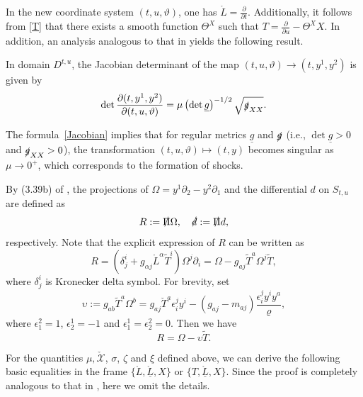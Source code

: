\documentclass[11pt,twoside]{article}
\def\al{\alpha}
\def\f{\frac}
\def\p{\partial}
\begin{document}
In the new coordinate system $(t, u, \vartheta)$, one has $\mathring{L} = \frac{\partial}{\partial t}$. Additionally, it
follows from \eqref{T} that
there exists a smooth function $\Theta^X$ such that $T=\frac{\partial}{\partial u} - \Theta^X X$.
In addition, an analysis analogous to that in \cite[Lemma 3.66]{Sp} yields the following result.


\begin{lemma}
In domain $D^{t,u}$, the Jacobian determinant of the map $(t, u, \vartheta) \rightarrow (t, y^1, y^2)$ is given by
\begin{equation}\label{Jacobian}
\det\frac{\partial(t, y^1, y^2)}{\partial(t, u, \vartheta)} = \mu \left(\det\underline{g}\right)^{-1/2} \sqrt{\slashed{g}_{XX}}.
\end{equation}
\end{lemma}

\begin{remark}
The formula~\eqref{Jacobian} implies that for regular  metrics $\underline g$ and $\slashed g$  (i.e., $\det\underline{g} > 0$ and
$\slashed{g}_{XX} > 0$), the transformation $(t,u,\vartheta)\mapsto (t,y)$
becomes singular as $\mu\to 0^+$, which corresponds to the  formation of shocks.
\end{remark}

By (3.39b) of \cite{Sp},
the projections of $\Omega=y^1\p_2-y^2\p_1$ and  the differential $d$ on $S_{t, u}$ are defined
as
\begin{equation*}
R:=\slashed\Pi\Omega,\quad \slashed d:=\slashed\Pi d,
\end{equation*}
respectively. Note that the explicit expression of $R$
can be written as
\begin{equation}\label{R}
R=(\delta_j^i+g_{\al j}\mathring L^\al\tilde T^i){\Omega}^j\p_i
=\Omega-g_{aj}\tilde{T}^a{\Omega}^j\tilde{T},
\end{equation}
where $\delta_j^i$ is Kronecker delta symbol. For brevity, set
\begin{equation}\label{omega}
\upsilon:=g_{ab}\tilde{T}^a{\Omega}^b=g_{aj}\check{T}^a\epsilon_i^jy^i-(g_{aj}-m_{aj})\f{\epsilon_i^j y^iy^a}\varrho,
\end{equation}
where $\epsilon_1^2=1$, $\epsilon_2^1=-1$ and $\epsilon_1^1=\epsilon_2^2=0$.
Then we have
\begin{equation}\label{YHCC16}
R=\Omega-\upsilon\tilde{T}.
\end{equation}

For the quantities $\mu, \check{\mathscr{X}}$, $\sigma$, $\zeta$ and $\xi$ defined above, we can derive the following
basic equalities in the frame $\{\mathring{L}, \mathring{\underline{L}}, X\}$ or $\{T, \mathring{\underline{L}}, X\}$.
Since the proof is completely analogous to that in \cite{Ding4}, here we omit the details.
\end{document}
